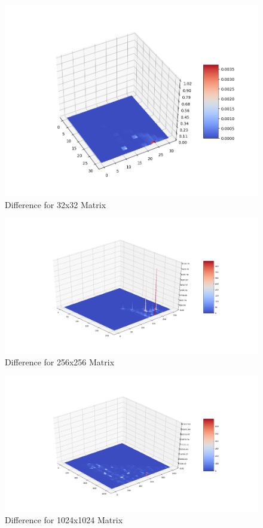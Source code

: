 \documentclass[12pt]{article}
\begin{document}
\begin{figure}[H]
    \centering
    \includegraphics[width=\textwidth]{imgs/32.png}
    \caption{Difference for 32x32 Matrix}
\end{figure}


\begin{figure}[H]
    \centering
    \includegraphics[width=\textwidth]{imgs/256.png}
    \caption{Difference for 256x256 Matrix}
\end{figure}

\begin{figure}[H]
    \centering
    \includegraphics[width=\textwidth]{imgs/1024.png}
    \caption{Difference for 1024x1024 Matrix}
\end{figure}
\end{document}
